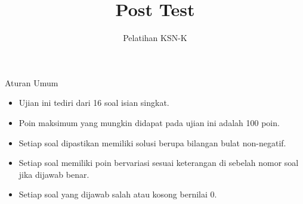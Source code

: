 \documentclass[11pt]{scrartcl}
\begin{document}
	\title{Post Test} %
	\date{}
	\author{Pelatihan KSN-K}
	\maketitle
	
	Aturan Umum
	\begin{itemize}
	    \item Ujian ini tediri dari 16 soal isian singkat.
	    \item Poin maksimum yang mungkin didapat pada ujian ini adalah 100 poin.
	    \item Setiap soal dipastikan memiliki solusi berupa bilangan bulat non-negatif.
	    \item Setiap soal memiliki poin bervariasi sesuai keterangan di sebelah nomor soal jika dijawab benar.
	    \item Setiap soal yang dijawab salah atau kosong bernilai 0.
	\end{itemize}
	
\end{document}
